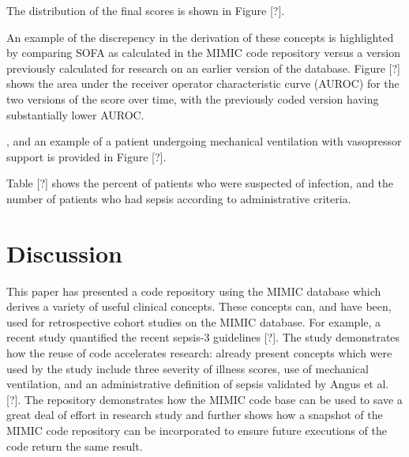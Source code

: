 \documentclass{elsart}
\begin{document}
The distribution of the final scores is shown in Figure [?].


An example of the discrepency in the derivation of these concepts is highlighted by comparing SOFA as calculated in the MIMIC code repository versus a version previously calculated for research on an earlier version of the database. Figure [?] shows the area under the receiver operator characteristic curve (AUROC) for the two versions of the score over time, with the previously coded version having substantially lower AUROC.


, and an example of a patient undergoing mechanical ventilation with vasopressor support is provided in Figure [?].



Table [?] shows the percent of patients who were suspected of infection, and the number of patients who had sepsis according to administrative criteria.

%


\section{Discussion}



This paper has presented a code repository using the MIMIC database which derives a variety of useful clinical concepts. These concepts can, and have been, used for retrospective cohort studies on the MIMIC database. For example, a recent study quantified the recent sepsis-3 guidelines [?]. The study demonstrates how the reuse of code accelerates research: already present concepts which were used by the study include three severity of illness scores, use of mechanical ventilation, and an administrative definition of sepsis validated by Angus et al. [?]. The repository demonstrates how the MIMIC code base can be used to save a great deal of effort in research study and further shows how a snapshot of the MIMIC code repository can be incorporated to ensure future executions of the code return the same result.
\end{document}
